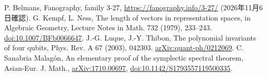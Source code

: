  P. Belmans, Fanography, family 3-27,
\url{https://fanography.info/3-27/} (2026年11月6日確認).
 G. Kempf, L. Ness, The length of vectors in representation spaces,
in Algebraic Geometry, Lecture Notes in Math. 732 (1979), 233--243.
\href{https://doi.org/10.1007/BFb0066647}{doi:10.1007/BFb0066647}.
 J.-G. Luque, J.-Y. Thibon, The polynomial invariants of four qubits,
Phys. Rev. A 67 (2003), 042303.
\href{https://arxiv.org/abs/quant-ph/0212069}{arXiv:quant-ph/0212069}.
 C. Sanabria Malagón, An elementary proof of the symplectic spectral theorem,
Asian-Eur. J. Math., \href{https://arxiv.org/abs/1710.00697}{arXiv:1710.00697},
\href{https://doi.org/10.1142/S1793557119500335}{doi:10.1142/S1793557119500335}.
